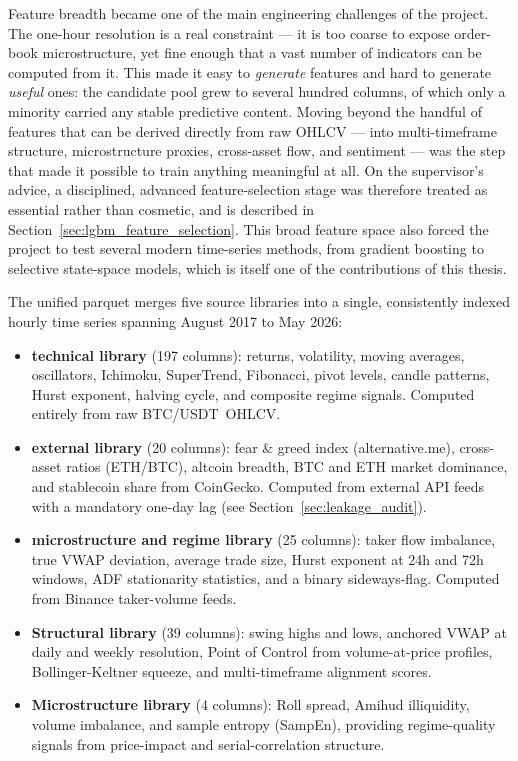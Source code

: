 Feature breadth became one of the main engineering challenges of the project. The one-hour resolution is a real constraint --- it is too coarse to expose order-book microstructure, yet fine enough that a vast number of indicators can be computed from it. This made it easy to \textit{generate} features and hard to generate \textit{useful} ones: the candidate pool grew to several hundred columns, of which only a minority carried any stable predictive content. Moving beyond the handful of features that can be derived directly from raw OHLCV --- into multi-timeframe structure, microstructure proxies, cross-asset flow, and sentiment --- was the step that made it possible to train anything meaningful at all. On the supervisor's advice, a disciplined, advanced feature-selection stage was therefore treated as essential rather than cosmetic, and is described in Section~\ref{sec:lgbm_feature_selection}. This broad feature space also forced the project to test several modern time-series methods, from gradient boosting to selective state-space models, which is itself one of the contributions of this thesis.


The unified parquet merges five source libraries into a single, consistently indexed hourly time series spanning August 2017 to May 2026:

\begin{itemize}
    \item \textbf{technical library} (197 columns): returns, volatility, moving averages, oscillators, Ichimoku, SuperTrend, Fibonacci, pivot levels, candle patterns, Hurst exponent, halving cycle, and composite regime signals. Computed entirely from raw \mbox{BTC/USDT OHLCV}.
    \item \textbf{external library} (20 columns): fear \& greed index (alternative.me), cross-asset ratios (ETH/BTC), altcoin breadth, BTC and ETH market dominance, and stablecoin share from CoinGecko. Computed from external API feeds with a mandatory one-day lag (see Section~\ref{sec:leakage_audit}).
    \item \textbf{microstructure and regime library} (25 columns): taker flow imbalance, true VWAP deviation, average trade size, Hurst exponent at 24h and 72h windows, ADF stationarity statistics, and a binary sideways-flag. Computed from Binance taker-volume feeds.
    \item \textbf{Structural library} (39 columns): swing highs and lows, anchored VWAP at daily and weekly resolution, Point of Control from volume-at-price profiles, Bollinger-Keltner squeeze, and multi-timeframe alignment scores.
    \item \textbf{Microstructure library} (4 columns): Roll spread, Amihud illiquidity, volume imbalance, and sample entropy (SampEn), providing regime-quality signals from price-impact and serial-correlation structure.
\end{itemize}


